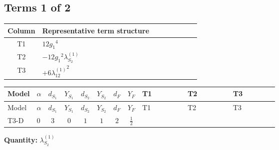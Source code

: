 \documentclass[8pt]{article}
\begin{document}
\begin{landscape}
\subsection*{Terms 1 of 2}
\begin{center}
\begin{tabular}{@{}c >{\raggedright\arraybackslash}p{0.82\linewidth}@{}}
\toprule
Column & Representative term structure \\
\midrule
T1 & \(\displaystyle 12 {g_1}^4\) \\
\midrule
T2 & \(\displaystyle -12 {g_1}^2 {\lambda_{S_2}^{(1)}}\) \\
\midrule
T3 & \(\displaystyle +6 {\lambda_{12}^{(1)}}^2\) \\
\midrule
\bottomrule
\end{tabular}
\end{center}
\smallskip
\tiny
\begin{longtable}{@{}llcccccc >{\raggedright\arraybackslash}p{0.21\linewidth} >{\raggedright\arraybackslash}p{0.21\linewidth} >{\raggedright\arraybackslash}p{0.21\linewidth}@{}}
\toprule
Model & $\alpha$ & $d_{S_1}$ & $Y_{S_1}$ & $d_{S_2}$ & $Y_{S_2}$ & $d_F$ & $Y_F$ & T1 & T2 & T3 \\
\midrule
\endfirsthead
\toprule
Model & $\alpha$ & $d_{S_1}$ & $Y_{S_1}$ & $d_{S_2}$ & $Y_{S_2}$ & $d_F$ & $Y_F$ & T1 & T2 & T3 \\
\midrule
\endhead
T3-D & $0$ & $3$ & $0$ & $1$ & $1$ & $2$ & $\frac{1}{2}$ & \scriptsize\adjustbox{max width=\linewidth}{$\begin{gathered} 12 {g_1}^4\end{gathered}$} & \scriptsize\adjustbox{max width=\linewidth}{$\begin{gathered} -12 {g_1}^2 {\lambda_{S_2}^{(1)}}\end{gathered}$} & \scriptsize\adjustbox{max width=\linewidth}{$\begin{gathered} +6 {\lambda_{12}^{(1)}}^2\end{gathered}$} \\
\midrule
\bottomrule
\end{longtable}
\clearpage
\noindent\textbf{Quantity: }$\lambda_{S_2}^{(1)}$\par\smallskip

\end{landscape}
\end{document}
